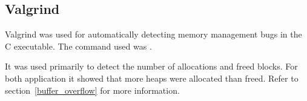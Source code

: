 \subsection{Valgrind}
Valgrind was used for automatically detecting memory management bugs in the C executable. The command used was .

It was used primarily to detect the number of allocations and freed blocks. For both application it showed that more heaps were allocated than freed. Refer to section~\ref{buffer_overflow} for more information.